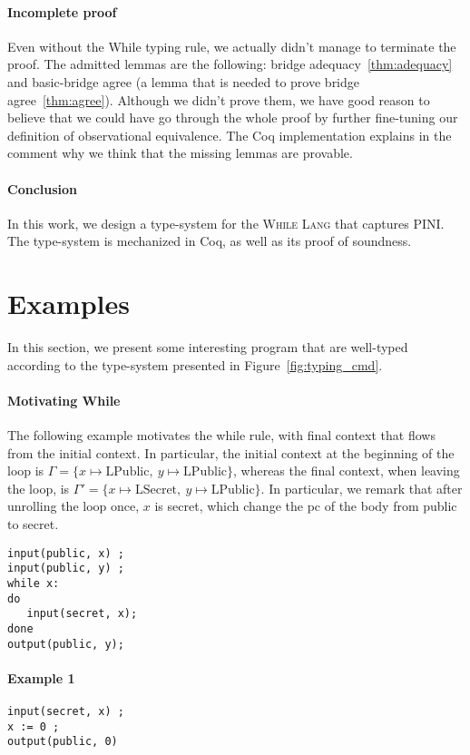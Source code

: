 \documentclass[10pt]{article}
\newcommand{\ctx}{\Gamma}
\newcommand{\public}{\mathrm{LPublic}}
\newcommand{\secret}{\mathrm{LSecret}}
\newcommand{\whilelang}{\textsc{While Lang} }
\begin{document}
\paragraph{Incomplete proof}
Even without the While typing rule, we actually didn't manage to terminate the proof.
The admitted lemmas are the following:
bridge adequacy~\ref{thm:adequacy} and basic-bridge agree (a lemma that is needed to prove bridge agree~\ref{thm:agree}).
Although we didn't prove them, we have good reason to believe that we could have go through the
whole proof by further fine-tuning our definition of observational equivalence. The Coq implementation explains in the comment why
we think that the missing lemmas are provable.

\paragraph{Conclusion}
In this work, we design a type-system for the \whilelang that captures PINI.
The type-system is mechanized in Coq, as well as its proof of soundness.

\appendix

\section{Examples}%
\label{sec:examples}

In this section, we present some interesting program that are well-typed according to the
type-system presented in Figure~\ref{fig:typing_cmd}.

\paragraph{Motivating While}
The following example motivates the while rule, with final context that flows from the initial
context. In particular, the initial context at the beginning of the loop is
$\ctx = \{ x \mapsto \public,\ y \mapsto \public \}$, whereas the final context, when leaving the
loop, is $\ctx' = \{ x \mapsto \secret,\ y \mapsto \public \}$. In particular, we remark that after
unrolling the loop once, $x$ is secret, which change the pc of the body from public to secret.
\begin{Verbatim}[samepage=true]
input(public, x) ;
input(public, y) ;
while x:
do
   input(secret, x);
done
output(public, y);
\end{Verbatim}

\paragraph{Example 1}
\begin{Verbatim}[samepage=true]
input(secret, x) ;
x := 0 ;
output(public, 0)
\end{Verbatim}
\end{document}
